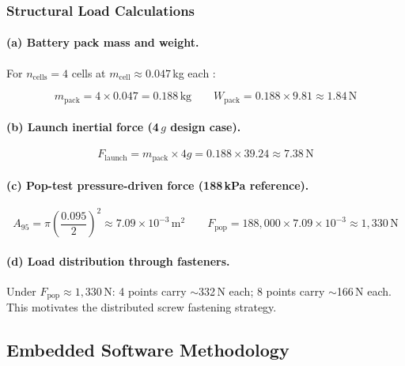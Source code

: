 \subsubsection{Structural Load Calculations}

\paragraph{(a) Battery pack mass and weight.}
For $n_\mathrm{cells} = 4$ cells at $m_\mathrm{cell} \approx 0.047$\,kg
each \cite{panasonic_cgr18650da_datasheet}:

\begin{equation}
  m_\mathrm{pack} = 4 \times 0.047 = 0.188\,\mathrm{kg}
  \qquad
  W_\mathrm{pack} = 0.188 \times 9.81 \approx 1.84\,\mathrm{N}
\end{equation}

\paragraph{(b) Launch inertial force (4\,$g$ design case).}

\begin{equation}
  F_\mathrm{launch} = m_\mathrm{pack} \times 4g = 0.188 \times 39.24 \approx 7.38\,\mathrm{N}
\end{equation}

\paragraph{(c) Pop-test pressure-driven force (188\,kPa reference).}

\begin{equation}
  A_{95} = \pi\left(\frac{0.095}{2}\right)^2 \approx 7.09 \times 10^{-3}\,\mathrm{m}^2
  \qquad
  F_\mathrm{pop} = 188{,}000 \times 7.09 \times 10^{-3} \approx 1{,}330\,\mathrm{N}
\end{equation}

\paragraph{(d) Load distribution through fasteners.}
Under $F_\mathrm{pop} \approx 1{,}330$\,N: 4 points carry $\sim$332\,N each; 8
points carry $\sim$166\,N each. This motivates the distributed screw fastening
strategy.

\subsection{Embedded Software Methodology}

